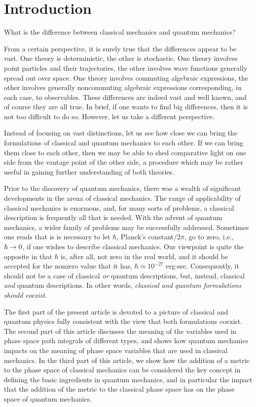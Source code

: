 \section{Introduction}
What is the difference between classical mechanics and quantum mechanics? 

{}From a certain perspective, it is surely true that the differences appear 
to be vast. One theory is deterministic, the other is stochastic. One 
theory involves point particles and their trajectories, the other 
involves wave functions generally spread out over space. One theory 
involves commuting algebraic expressions, the other involves generally 
noncommuting algebraic expressions corresponding, in each case, to 
observables. These differences are indeed vast and well known, and 
of course they are all true. In brief, if one wants to find big 
differences, then it is not too difficult to do so. However, let us 
take a different perspective.

Instead of focusing on vast distinctions, let us see how close we can 
bring the formulations of classical and quantum mechanics to each other. 
If we can bring them close to each other, then we may be able to shed 
comparative light on one side from the vantage point of the other side, 
a procedure which may be rather useful in gaining further understanding 
of both theories.

Prior to the discovery of quantum mechanics, there was a wealth of 
significant developments in the arena of classical mechanics. The range of 
applicability of classical mechanics is enormous, and, for many sorts of 
problems, a classical description is frequently all that is needed. With 
the advent of quantum mechanics, a wider family of problems may be 
successfully addressed. Sometimes one reads that is is necessary to let 
$\hbar$, Planck's constant$/2\pi$, go to zero, i.e., $\hbar\rightarrow0$, if one 
wishes to describe classical mechanics. Our viewpoint is quite the 
opposite in that $\hbar$ is, after all, not zero in the real world, and 
it should be accepted for the nonzero value that it has, 
$\hbar\simeq 10^{-27}$ erg-sec. Consequently, it should not be a case of 
classical {\it or} quantum descriptions, but, instead, classical 
{\it and} quantum descriptions. In other words, {\it classical and 
quantum formulations should coexist}.

The first part of the present article is devoted to a picture of classical 
and quantum physics fully consistent with the view that both formulations 
coexist. The second part of this article discusses the meaning of the 
variables used in phase space path integrals of different types, and 
shows how quantum mechanics impacts on the meaning of phase space 
variables that are used in classical mechanics. In the third part of 
this article, we show how the addition of a metric to the phase space of
classical mechanics can be considered the key concept in defining the 
basic ingredients in quantum mechanics, and in particular the impact that 
the addition of the metric to the classical phase space has on the phase 
space of quantum mechanics. 

